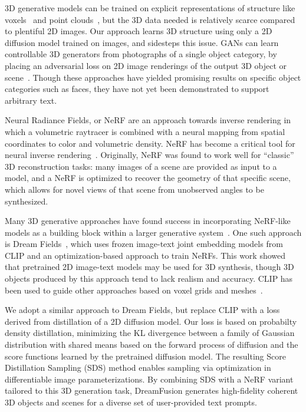 \documentclass{article} %
\newcommand{\sacc}{SDS\xspace}
\newcommand{\dreamfusion}{DreamFusion\xspace}
\begin{document}
3D generative models can be trained on explicit representations of structure like voxels~\citep{3dgan, chen2018text2shape} and point clouds~\citep{pointflow, ShapeGF, pointvoxel}, but the 3D data needed is relatively scarce compared to plentiful 2D images.
Our approach learns 3D structure using only a 2D diffusion model trained on images, and sidesteps this issue.
GANs can learn controllable 3D generators from photographs of a single object category, by placing an adversarial loss on 2D image renderings of the output 3D object or scene~\citep{henzler2019platonicgan,HoloGAN2019,orel2022stylesdf}. Though these approaches have yielded promising results on specific object categories such as faces, they have not yet been demonstrated to support arbitrary text.

Neural Radiance Fields, or NeRF \citep{mildenhall2020nerf} are an approach towards inverse rendering in which a volumetric raytracer is combined with a neural mapping from spatial coordinates to color and volumetric density. NeRF has become a critical tool for neural inverse rendering~\citep{tewari2022advances}.
Originally, NeRF was found to work well for ``classic'' 3D reconstruction tasks: many images of a scene are provided as input to a model, and a NeRF is optimized to recover the geometry of that specific scene, which allows for novel views of that scene from unobserved angles to be synthesized.



Many 3D generative approaches have found success in incorporating NeRF-like models as a building block within a larger generative system~\citep{graf,chanmonteiro2020pi-GAN,Chan2021eg3d,gu2021stylenerf, https://doi.org/10.48550/arxiv.2203.14622}.
One such approach is Dream Fields~\citep{jain2021dreamfields}, which uses frozen image-text joint embedding models from CLIP and an optimization-based approach to train NeRFs. This work showed that pretrained 2D image-text models may be used for 3D synthesis, though 3D objects produced by this approach tend to lack realism and accuracy. CLIP has been used to guide other approaches based on voxel grids and meshes~\citep{clipforge, clipmatrix, clipnerf}.

We adopt a similar approach to Dream Fields, but replace CLIP with a loss derived from distillation of a 2D diffusion model. Our loss is based on probabilty density distillation, minimizing the KL divergence between a family of Gaussian distribution with shared means based on the forward process of diffusion and the score functions learned by the pretrained diffusion model. The resulting Score Distillation Sampling (\sacc) method enables sampling via optimization in differentiable image parameterizations.
By combining \sacc with a NeRF variant tailored to this 3D generation task, \dreamfusion{} generates high-fidelity coherent 3D objects and scenes for a  diverse set of user-provided text prompts.
\end{document}

